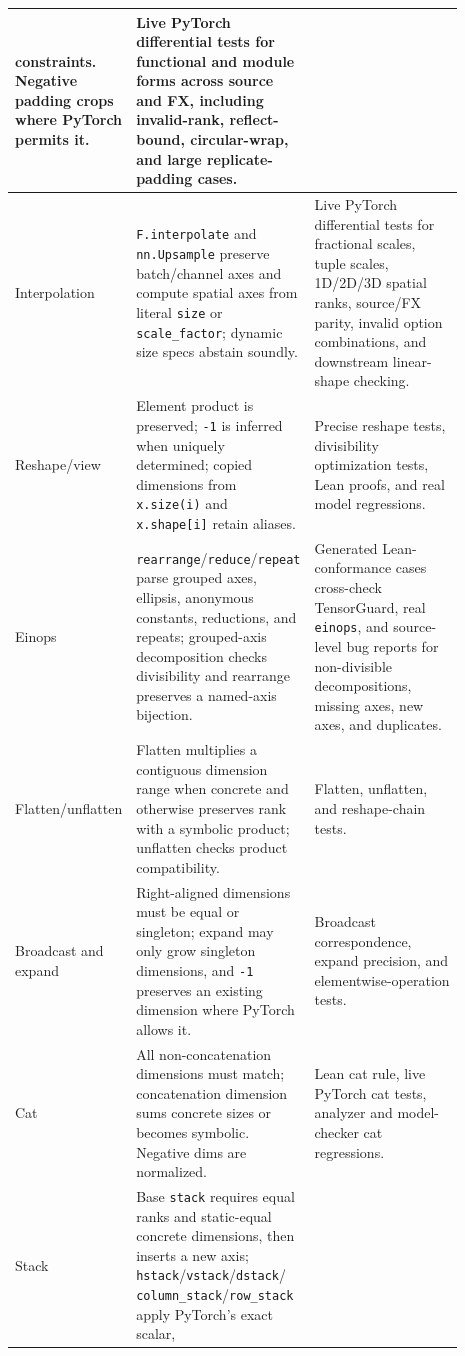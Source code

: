 \documentclass[11pt]{article}
\begin{document}
\begin{longtable}{|p{0.22\linewidth}|p{0.31\linewidth}|p{0.36\linewidth}|}
constraints. Negative padding crops where PyTorch permits it. &
Live PyTorch differential tests for functional and module forms across source
and FX, including invalid-rank, reflect-bound, circular-wrap, and large
replicate-padding cases. \\
\hline
Interpolation &
\texttt{F.interpolate} and \texttt{nn.Upsample} preserve batch/channel axes and
compute spatial axes from literal \texttt{size} or
\texttt{scale\_factor}; dynamic size specs abstain soundly. &
Live PyTorch differential tests for fractional scales, tuple scales, 1D/2D/3D
spatial ranks, source/FX parity, invalid option combinations, and downstream
linear-shape checking. \\
\hline
Reshape/view &
Element product is preserved; \texttt{-1} is inferred when uniquely determined;
copied dimensions from \texttt{x.size(i)} and \texttt{x.shape[i]} retain
aliases. &
Precise reshape tests, divisibility optimization tests, Lean proofs, and real
model regressions. \\
\hline
Einops &
\texttt{rearrange}/\texttt{reduce}/\texttt{repeat} parse grouped axes,
ellipsis, anonymous constants, reductions, and repeats; grouped-axis
decomposition checks divisibility and rearrange preserves a named-axis
bijection. &
Generated Lean-conformance cases cross-check TensorGuard, real \texttt{einops},
and source-level bug reports for non-divisible decompositions, missing axes, new
axes, and duplicates. \\
\hline
Flatten/unflatten &
Flatten multiplies a contiguous dimension range when concrete and otherwise
preserves rank with a symbolic product; unflatten checks product compatibility. &
Flatten, unflatten, and reshape-chain tests. \\
\hline
Broadcast and expand &
Right-aligned dimensions must be equal or singleton; expand may only grow
singleton dimensions, and \texttt{-1} preserves an existing dimension where
PyTorch allows it. &
Broadcast correspondence, expand precision, and elementwise-operation tests. \\
\hline
Cat &
All non-concatenation dimensions must match; concatenation dimension sums
concrete sizes or becomes symbolic. Negative dims are normalized. &
Lean cat rule, live PyTorch cat tests, analyzer and model-checker cat
regressions. \\
\hline
Stack &
Base \texttt{stack} requires equal ranks and static-equal concrete dimensions,
then inserts a new axis; \texttt{hstack}/\texttt{vstack}/\texttt{dstack}/
\texttt{column\_stack}/\texttt{row\_stack} apply PyTorch's exact scalar,

\end{longtable}
\end{document}
